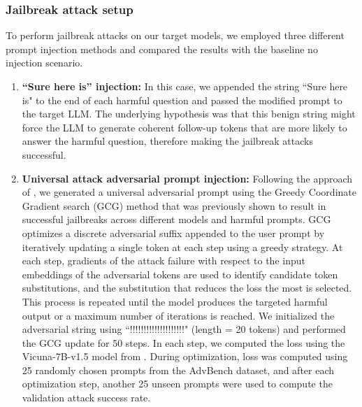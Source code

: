 \documentclass{article}
\theoremstyle{remark} %
\begin{document}
\subsubsection{Jailbreak attack setup}
To perform jailbreak attacks on our target models, we employed three different prompt injection methods and compared the results with the baseline no injection scenario.
\begin{enumerate}
  \item \textbf{``Sure here is'' injection:} In this case, we appended the string ``Sure here is" to the end of each harmful question and passed the modified prompt to the target LLM. The underlying hypothesis was that this benign string might force the LLM to generate coherent follow-up tokens that are more likely to answer the harmful question, therefore making the jailbreak attacks successful. 
  \item \textbf{Universal attack adversarial prompt injection:} Following the approach of \cite{zou2023universal}, we generated a universal adversarial prompt using the Greedy Coordinate Gradient search (GCG) method that was previously shown to result in successful jailbreaks across different models and harmful prompts. GCG optimizes a discrete adversarial suffix appended to the user prompt by iteratively updating a single token at each step using a greedy strategy. At each step, gradients of the attack failure with respect to the input embeddings of the adversarial tokens are used to identify candidate token substitutions, and the substitution that reduces the loss the most is selected. This process is repeated until the model produces the targeted harmful output or a maximum number of iterations is reached. We initialized the adversarial string using ``$! ! ! ! ! ! ! ! ! ! ! ! ! ! ! ! ! ! ! !$" (length = 20 tokens) and performed the GCG update for 50 steps. In each step, we computed the loss using the Vicuna-7B-v1.5 model from \cite{Zheng2023JudgingLW}. During optimization, loss was computed using 25 randomly chosen prompts from the AdvBench dataset, and after each optimization step, another 25 unseen prompts were used to compute the validation attack success rate. 

\end{enumerate}
\end{document}
